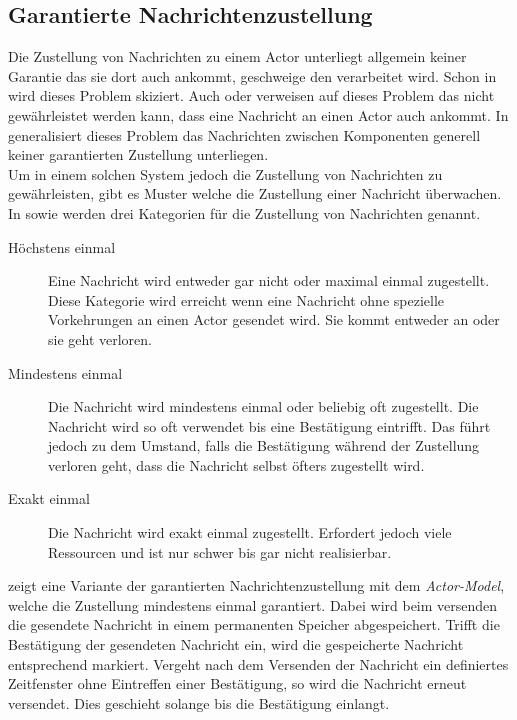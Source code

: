 \subsection{Garantierte Nachrichtenzustellung}\label{sec:actor:patterns:guaranteedDelivery}
Die Zustellung von Nachrichten zu einem Actor unterliegt allgemein keiner Garantie das sie dort auch ankommt, geschweige den verarbeitet wird. Schon in \cite{Agha1985ConcurrentParallelism} wird dieses Problem skiziert. Auch \cite{Vernon2015ReactiveAkka} oder \cite{CloudComputingPatterns2014} verweisen auf dieses Problem das nicht gewährleistet werden kann, dass eine Nachricht an einen Actor auch ankommt. In \cite{CloudComputingPatterns2014} generalisiert dieses Problem das Nachrichten zwischen Komponenten generell keiner garantierten Zustellung unterliegen. \\
% 
% 
Um in einem solchen System jedoch die Zustellung von Nachrichten zu gewährleisten, gibt es Muster welche die Zustellung einer Nachricht überwachen. In \cite{messagedeliveryreliabilityakkadocumentation} sowie \cite{hughmckee_2017} werden drei Kategorien für die Zustellung von Nachrichten genannt.
\begin{description}
    \item [Höchstens einmal] Eine Nachricht wird entweder gar nicht oder maximal einmal zugestellt. Diese Kategorie wird erreicht wenn eine Nachricht ohne spezielle Vorkehrungen an einen Actor gesendet wird. Sie kommt entweder an oder sie geht verloren.
    \item [Mindestens einmal] Die Nachricht wird mindestens einmal oder beliebig oft zugestellt. Die Nachricht wird so oft verwendet bis eine Bestätigung eintrifft. Das führt jedoch zu dem Umstand, falls die Bestätigung während der Zustellung verloren geht, dass die Nachricht selbst öfters zugestellt wird.
    \item [Exakt einmal] Die Nachricht wird exakt einmal zugestellt. Erfordert jedoch viele Ressourcen und ist nur schwer bis gar nicht realisierbar.
\end{description}
\cite{Vernon2015ReactiveAkka} zeigt eine Variante der garantierten Nachrichtenzustellung mit dem \textit{Actor-Model}, welche die Zustellung mindestens einmal garantiert. Dabei wird beim versenden die gesendete Nachricht in einem permanenten Speicher abgespeichert. Trifft die Bestätigung der gesendeten Nachricht ein, wird die gespeicherte Nachricht entsprechend markiert. Vergeht nach dem Versenden der Nachricht ein definiertes Zeitfenster ohne Eintreffen einer Bestätigung, so wird die Nachricht erneut versendet. Dies geschieht solange bis die Bestätigung einlangt. \\
